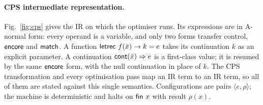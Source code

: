 \paragraph{CPS intermediate representation.}
Fig.~\ref{fig:cps} gives the IR on which the optimiser runs.
Its expressions are in A-normal form: every operand is a variable, and only two forms transfer control, $\mathsf{encore}$ and $\mathsf{match}$.
A function $\mathsf{letrec}\ f(\bar{x}) \to k = e$ takes its continuation $k$ as an explicit parameter.
A continuation $\mathsf{cont}(\bar{x}) \Rightarrow e$ is a first-class value; it is resumed by the same $\mathsf{encore}$ form, with the null continuation in place of $k$.
The CPS transformation and every optimisation pass map an IR term to an IR term, so all of them are stated against this single semantics.
Configurations are pairs $\langle e, \rho \rangle$; the machine is deterministic and halts on $\mathsf{fin}\ x$ with result $\rho(x)$.

